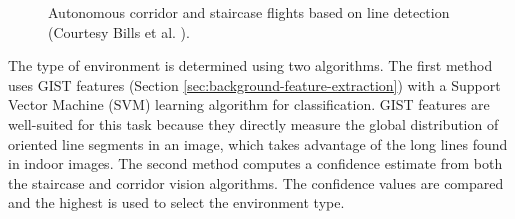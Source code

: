 \begin{figure}[htb!]
  \begin{center}
\hspace{1cm}
   
  \end{center}
  \caption{Autonomous corridor and staircase flights based on line detection (Courtesy Bills et al. \cite{Bills2011icra}).}
  \label{featureImg}
\end{figure}

The type of environment is determined using two algorithms.
The first method uses GIST features \cite{oliva2001modeling} (Section \ref{sec:background-feature-extraction}) with a Support Vector Machine (SVM) learning algorithm for classification.
GIST features are well-suited for this task because they directly measure the global distribution of oriented line segments in an image, which takes advantage of the long lines found in indoor images.
The second method computes a confidence estimate from both the staircase and corridor vision algorithms.
The confidence values are compared and the highest is used to select the environment type.

